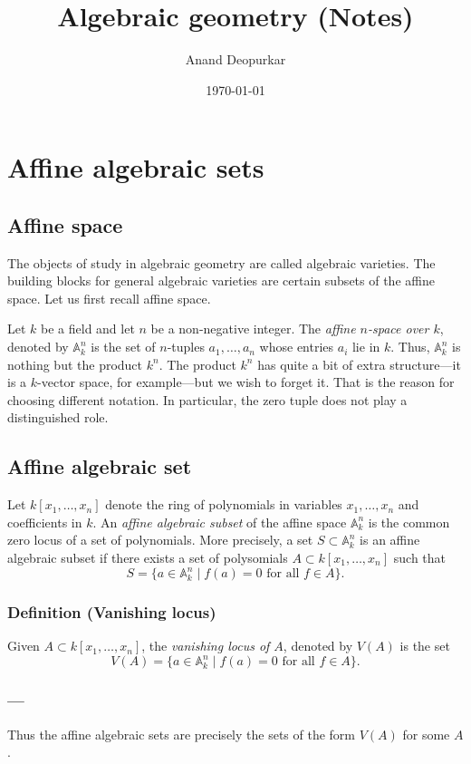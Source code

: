 \documentclass[11pt]{article}
\author{Anand Deopurkar}
\date{\today}
\title{Algebraic geometry (Notes)}
\begin{document}
\maketitle

\section{Affine algebraic sets}
\label{sec:orgb543cc8}
\subsection{Affine space}
\label{sec:orga7eba34}
The objects of study in algebraic geometry are called algebraic varieties.
The building blocks for general algebraic varieties are certain subsets of the affine space.
Let us first recall affine space.

Let \(k\) be a field and let \(n\) be a non-negative integer.
The \emph{affine \(n\)-space over \(k\)}, denoted by \(\mathbb A^n_k\) is the set of \(n\)-tuples \(a_1,\dots, a_n\) whose entries \(a_i\) lie in \(k\).
Thus, \(\mathbb A^n_k\) is nothing but the product \(k^n\).
The product \(k^n\) has quite a bit of extra structure---it is a \(k\)-vector space, for example---but we wish to forget it.
That is the reason for choosing different notation.
In particular, the zero tuple does not play a distinguished role.

\subsection{Affine algebraic set}
\label{sec:org8ada370}
Let \(k[x_1,\dots,x_n]\) denote the ring of polynomials in variables \(x_1, \dots, x_n\) and coefficients in \(k\).
An \emph{affine algebraic subset} of the affine space \(\mathbb A^n_k\) is the common zero locus of a set of polynomials.
More precisely, a set \(S \subset \mathbb A^n_k\) is an affine algebraic subset if there exists a set of polysomials \(A \subset k[x_1,\dots,x_n]\) such that
\[ S = \{a \in \mathbb A^n_k \mid f(a) = 0 \text{ for all } f \in A\}.\]
\subsubsection{Definition (Vanishing locus)}
\label{sec:org487ba9d}
Given \(A \subset k[x_1,\dots,x_n]\), the \emph{vanishing locus of \(A\)}, denoted by \(V(A)\) is the set 
\[ V(A) = \{a \in \mathbb A^n_k \mid f(a) = 0 \text{ for all } f \in A\}.\]

\subsubsection*{---}
\label{sec:org31e8321}
Thus the affine algebraic sets are precisely the sets of the form \(V(A)\) for some \(A\).
\end{document}
